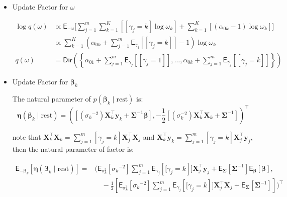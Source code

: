 \begin{appendix}
\begin{itemize}
with:

\begin{equation}
\log \rho_{jk} \propto -\tfrac{n_j}{2}\mathsf{E}_{\sigma^2_k}\left[\log\sigma^2_{k}\right]
-\tfrac{1}{2}\mathsf{E}_{\sigma^2_k}\left[\frac{1}{\sigma^2_{k}}\right]\mathsf{E}_{\bm{\beta}_k}\left[\left(\bm{y}_{j}-\bm{X}_{j}\bm{\beta}_{k}\right)^\top\left(\bm{y}_{j}-\bm{X}_{j}\bm{\beta}_{k}\right)\right]+\mathsf{E}_{\omega}\left[\log\omega_k\right]
\end{equation}

\item Update Factor for $\omega$

\begin{equation}
\begin{split}
\log q(\omega) &\propto \mathsf{E}_{-\omega}\Bigg[\sum_{j=1}^{m}\sum_{k=1}^{K}\left[[\gamma_j=k]\log\omega_k\right] 
+ \sum_{k=1}^{K}\left[(\alpha_{0k}-1)\log\omega_k\right] \Bigg]\\
&\propto \sum_{k=1}^{K}\left(\alpha_{0k}+\sum_{j=1}^{m}\mathsf{E}_{\gamma_j}\left[[\gamma_j=k]\right]-1\right)\log\omega_k\\
q(\omega)&=\mathsf{Dir}\left(\left\lbrace \alpha_{01}+\sum_{j=1}^{m}\mathsf{E}_{\gamma_j}\left[[\gamma_j=1]\right],\dots,\alpha_{0k}+\sum_{j=1}^{m}\mathsf{E}_{\gamma_j}\left[[\gamma_j=k]\right]\right\rbrace\right)
\end{split}
\end{equation}

\newpage

\item Update Factor for $\bm{\beta}_k$

The natural parameter of $p(\bm{\beta}_k \mid \text{rest}) $ is:
\begin{equation}
\bm{\eta}(\bm{\beta}_k \mid \text{rest})=\left(\left[ ({\sigma_k}^{-2}) \bm{X}_{k}^\top \bm{y}_{k} + \bm{\Sigma}^{-1} \bm{\beta} \right],-\frac{1}{2}\left[ (\sigma_k^{-2}) \bm{X}_{k}^\top \bm{X}_{k}  + \bm{\Sigma}^{-1} \right]\right)^\top
\end{equation}

note that $\bm{X}_{k}^\top \bm{X}_{k}=\sum_{j=1}^{m}[\gamma_j=k]\bm{X}_{j}^\top \bm{X}_{j}$ and $\bm{X}_{k}^\top \bm{y}_{k}=\sum_{j=1}^{m}[\gamma_j=k]\bm{X}_{j}^\top \bm{y}_{j}$, then the natural parameter of factor is:

\begin{equation}
\begin{split}
\mathsf{E}_{-\bm{\beta}_k}\left[\bm{\eta}(\bm{\beta}_k \mid \text{rest})\right]=&\Bigg(\mathsf{E}_{\sigma^2_k}\left[{\sigma_k}^{-2}\right] \sum_{j=1}^{m}\mathsf{E}_{\gamma_j}\left[[\gamma_j=k\right]]\bm{X}_{j}^\top \bm{y}_{j} + \mathsf{E}_{\bm{\Sigma}}\left[\bm{\Sigma}^{-1}\right] \mathsf{E}_{\bm{\beta}}\left[\bm{\beta} \right],\\
&\quad -\frac{1}{2}\left[\mathsf{E}_{\sigma^2_k}\left[{\sigma_k}^{-2}\right] \sum_{j=1}^{m}\mathsf{E}_{\gamma_j}\left[[\gamma_j=k\right]]\bm{X}_{j}^\top \bm{X}_{j}  + \mathsf{E}_{\bm{\Sigma}}\left[\bm{\Sigma}^{-1}\right]  \right]\Bigg)^\top
\end{split}
\end{equation}


\end{itemize}
\end{appendix}
